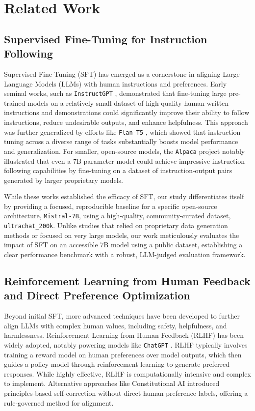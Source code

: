 \documentclass[11pt]{article}
\begin{document}
\section{Related Work}

\subsection{Supervised Fine-Tuning for Instruction Following}
Supervised Fine-Tuning (SFT) has emerged as a cornerstone in aligning Large Language Models (LLMs) with human instructions and preferences. Early seminal works, such as \texttt{InstructGPT} \cite{ouyang2022training}, demonstrated that fine-tuning large pre-trained models on a relatively small dataset of high-quality human-written instructions and demonstrations could significantly improve their ability to follow instructions, reduce undesirable outputs, and enhance helpfulness. This approach was further generalized by efforts like \texttt{Flan-T5} \cite{chung2022scaling}, which showed that instruction tuning across a diverse range of tasks substantially boosts model performance and generalization. For smaller, open-source models, the \texttt{Alpaca} project \cite{taori2023stanford} notably illustrated that even a 7B parameter model could achieve impressive instruction-following capabilities by fine-tuning on a dataset of instruction-output pairs generated by larger proprietary models.

While these works established the efficacy of SFT, our study differentiates itself by providing a focused, reproducible baseline for a specific open-source architecture, \texttt{Mistral-7B}, using a high-quality, community-curated dataset, \texttt{ultrachat\_200k}. Unlike studies that relied on proprietary data generation methods or focused on very large models, our work meticulously evaluates the impact of SFT on an accessible 7B model using a public dataset, establishing a clear performance benchmark with a robust, LLM-judged evaluation framework.

\subsection{Reinforcement Learning from Human Feedback and Direct Preference Optimization}
Beyond initial SFT, more advanced techniques have been developed to further align LLMs with complex human values, including safety, helpfulness, and harmlessness. Reinforcement Learning from Human Feedback (RLHF) \cite{christiano2017deep_rlhf, stiennon2020learning_summarization} has been widely adopted, notably powering models like \texttt{ChatGPT} \cite{openai2023chatgpt}. RLHF typically involves training a reward model on human preferences over model outputs, which then guides a policy model through reinforcement learning to generate preferred responses. While highly effective, RLHF is computationally intensive and complex to implement. Alternative approaches like Constitutional AI \cite{bai2022constitutional} introduced principles-based self-correction without direct human preference labels, offering a rule-governed method for alignment.
\end{document}
